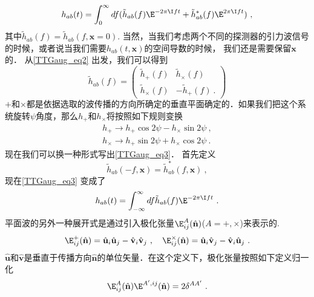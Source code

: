 \begin{equation}\label{TTGaug_eq3}
h_{ab} (t) = \int^\infty_0 df ( \tilde h_{ab} (f) \E^{-2\pi \I f t} + \tilde h^*_{ab} (f) \E^{2\pi \I f t} ) ~, 
\end{equation}
其中$\tilde h_{ab}(f) = \tilde h_{ab}(f,\mathbf x = 0)$. 当然，当我们考虑两个不同的探测器的引力波信号的时候，或者说当我们需要$h_{ab}(t,\mathbf x)$的空间导数的时候， 我们还是需要保留$\mathbf x$的． 从\autoref{TTGaug_eq2} 出发，我们可以得到
\begin{equation}
\tilde h_{ab} (f) = 
\begin{pmatrix}
\tilde h_+(f) & \tilde h_{\times} (f) \\
\tilde h_{\times} (f) & -\tilde h_+ (f) ~.
\end{pmatrix}
\end{equation}
$+$和$\times$都是依据选取的波传播的方向所确定的垂直平面确定的．如果我们把这个系统旋转$\psi$角度，那么$h_+$和$h_{\times}$将按照如下规则变换
\begin{equation}
\begin{aligned}
h_+\rightarrow h_+ \cos 2 \psi - h_\times \sin 2 \psi ~, \\
h_\times \rightarrow h_+ \sin 2 \psi + h_\times \cos 2\psi ~.
\end{aligned}
\end{equation}
现在我们可以换一种形式写出\autoref{TTGaug_eq3}． 首先定义
\begin{equation}
\tilde h_{ab} (-f,\mathbf x) = \tilde h^*_{ab} (f,\mathbf x) ~,
\end{equation}
现在\autoref{TTGaug_eq3} 变成了
\begin{equation}
h_{ab} (t) = \int_{-\infty}^{\infty} df \tilde h_{ab} (f) \E^{-2\pi \I f t}~. 
\end{equation}
平面波的另外一种展开式是通过引入极化张量$\E^A_{ij}(\hat{ {\mathbf n} })$($A = +,\times$)来表示的. 
\begin{equation}
\E^+_{ij} (\hat{ {\mathbf n} }) = \hat{{\mathbf u} }_i \hat{{\mathbf u} }_j - \hat{{\mathbf v} }_i \hat{{\mathbf v} }_j~, \quad \E^\times_{ij} (\hat{ {\mathbf n} }) = \hat{{\mathbf u} }_i \hat{{\mathbf v} }_j - \hat{{\mathbf v} }_i \hat{{\mathbf u} }_j ~.
\end{equation}
$\hat{ {\mathbf u} }$和$\hat{ {\mathbf v} }$是垂直于传播方向$\hat{  {\mathbf n}  }$的单位矢量．在这个定义下，极化张量按照如下定义归一化
\begin{equation}
\E^A_{ij}(\hat{ {\mathbf n} }) \E^{A',ij} (\hat{ {\mathbf n} }) = 2 \delta^{AA'} ~.  
\end{equation}
